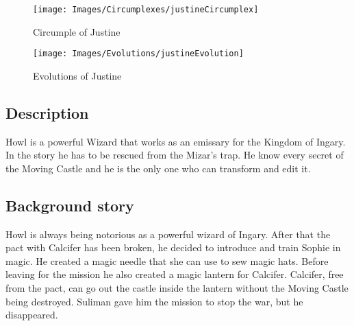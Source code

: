 \begin{figure}
  \centering
  \texttt{[image: Images/Circumplexes/justineCircumplex]}
  \caption{Circumple of Justine}
\end{figure}

\begin{figure}
  \centering
   \texttt{[image: Images/Evolutions/justineEvolution]}
  \caption{Evolutions of Justine}
\end{figure}

\subsection{Description}
Howl is a powerful Wizard that works as an emissary for the Kingdom of Ingary. In the story he has to be rescued from the Mizar’s trap. He know every secret of the Moving Castle and he is the only one who can transform and edit it.

\subsection{Background story}
Howl is always being notorious as a powerful wizard of Ingary. After that the pact with Calcifer has been broken, he decided to introduce and train Sophie in magic. He created a magic needle that she can use to sew magic hats. Before leaving for the mission he also created a magic lantern for Calcifer. Calcifer, free from the pact, can go out the castle inside the lantern without the Moving Castle being destroyed. Suliman gave him the mission to stop the war, but he disappeared.




